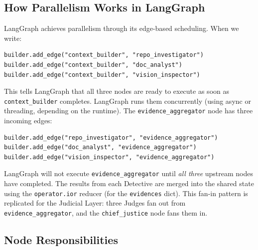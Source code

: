 \documentclass[12pt,a4paper]{article}
\begin{document}
\subsection{How Parallelism Works in LangGraph}

LangGraph achieves parallelism through its edge-based scheduling. When we write:

\begin{lstlisting}[caption={Fan-out wiring in \texttt{src/graph.py}}]
builder.add_edge("context_builder", "repo_investigator")
builder.add_edge("context_builder", "doc_analyst")
builder.add_edge("context_builder", "vision_inspector")
\end{lstlisting}

This tells LangGraph that all three nodes are ready to execute as soon as \texttt{context\_builder} completes. LangGraph runs them concurrently (using async or threading, depending on the runtime). The \texttt{evidence\_aggregator} node has three incoming edges:

\begin{lstlisting}[caption={Fan-in wiring in \texttt{src/graph.py}}]
builder.add_edge("repo_investigator", "evidence_aggregator")
builder.add_edge("doc_analyst", "evidence_aggregator")
builder.add_edge("vision_inspector", "evidence_aggregator")
\end{lstlisting}

LangGraph will not execute \texttt{evidence\_aggregator} until \emph{all three} upstream nodes have completed. The results from each Detective are merged into the shared state using the \texttt{operator.ior} reducer (for the \texttt{evidences} dict). This fan-in pattern is replicated for the Judicial Layer: three Judges fan out from \texttt{evidence\_aggregator}, and the \texttt{chief\_justice} node fans them in.

\subsection{Node Responsibilities}
\end{document}
